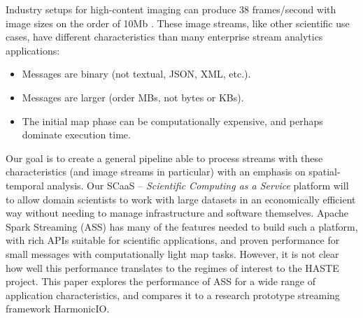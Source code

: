 \documentclass[conference]{IEEEtran}
\begin{document}
Industry setups for high-content imaging can produce 38 frames/second with image sizes on the order of 10Mb \cite{lugnegaard2018building}. 
These image streams, like other scientific use cases, have different characteristics than many enterprise stream analytics applications: %


\begin{itemize}
\item Messages are binary (not textual, JSON, XML, etc.).
\item Messages are larger (order MBs, not bytes or KBs).
\item The initial map phase can be computationally expensive, and perhaps dominate execution time.
\end{itemize}



Our goal is to create a general pipeline able to process streams with these characteristics (and image streams in particular) with an emphasis on spatial-temporal analysis. Our SCaaS -- \emph{Scientific Computing as a Service} platform will to allow domain scientists to work with large datasets in an economically efficient way
without needing to manage infrastructure and software themselves. Apache Spark Streaming (ASS) has many of the features needed to build such a platform, with rich APIs suitable for scientific applications, and proven performance for small messages with computationally light map tasks. However, it is not clear how well this performance translates to the regimes of interest to the HASTE project. This paper explores the performance of ASS for a wide range of application characteristics, and compares it to a research prototype streaming framework HarmonicIO. %
\end{document}
